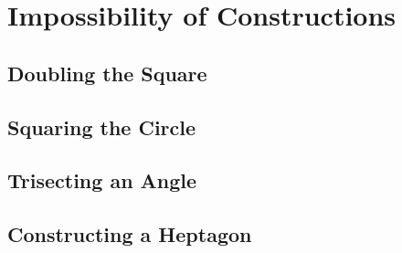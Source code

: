 \section{Impossibility of Constructions}

\subsection{Doubling the Square}

\subsection{Squaring the Circle}

\subsection{Trisecting an Angle}

\subsection{Constructing a Heptagon}
